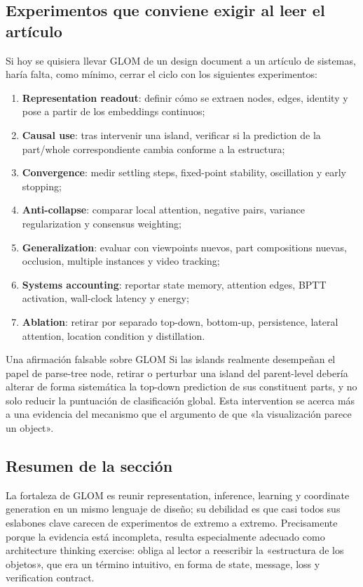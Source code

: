 \subsection{Experimentos que conviene exigir al leer el artículo}

Si hoy se quisiera llevar GLOM de un design document a un artículo de sistemas, haría falta, como mínimo, cerrar el ciclo con los siguientes experimentos:

\begin{enumerate}
  \item \textbf{Representation readout}: definir cómo se extraen nodes, edges, identity y pose a partir de los embeddings continuos;
  \item \textbf{Causal use}: tras intervenir una island, verificar si la prediction de la part/whole correspondiente cambia conforme a la estructura;
  \item \textbf{Convergence}: medir settling steps, fixed-point stability, oscillation y early stopping;
  \item \textbf{Anti-collapse}: comparar local attention, negative pairs, variance regularization y consensus weighting;
  \item \textbf{Generalization}: evaluar con viewpoints nuevos, part compositions nuevas, occlusion, multiple instances y video tracking;
  \item \textbf{Systems accounting}: reportar state memory, attention edges, BPTT activation, wall-clock latency y energy;
  \item \textbf{Ablation}: retirar por separado top-down, bottom-up, persistence, lateral attention, location condition y distillation.
\end{enumerate}

\begin{importantbox}{Una afirmación falsable sobre GLOM}
Si las islands realmente desempeñan el papel de parse-tree node, retirar o perturbar una island del parent-level debería alterar de forma sistemática la top-down prediction de sus constituent parts, y no solo reducir la puntuación de clasificación global. Esta intervention se acerca más a una evidencia del mecanismo que el argumento de que «la visualización parece un object».
\end{importantbox}

\subsection{Resumen de la sección}

La fortaleza de GLOM es reunir representation, inference, learning y coordinate generation en un mismo lenguaje de diseño; su debilidad es que casi todos sus eslabones clave carecen de experimentos de extremo a extremo. Precisamente porque la evidencia está incompleta, resulta especialmente adecuado como architecture thinking exercise: obliga al lector a reescribir la «estructura de los objetos», que era un término intuitivo, en forma de state, message, loss y verification contract.
